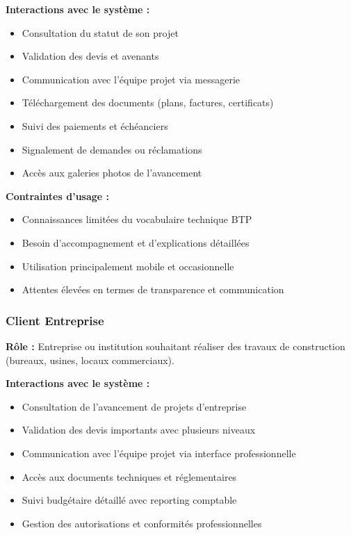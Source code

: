 \textbf{Interactions avec le système :}
\begin{itemize}
    \item Consultation du statut de son projet
    \item Validation des devis et avenants
    \item Communication avec l'équipe projet via messagerie
    \item Téléchargement des documents (plans, factures, certificats)
    \item Suivi des paiements et échéanciers
    \item Signalement de demandes ou réclamations
    \item Accès aux galeries photos de l'avancement
\end{itemize}

\textbf{Contraintes d'usage :}
\begin{itemize}
    \item Connaissances limitées du vocabulaire technique BTP
    \item Besoin d'accompagnement et d'explications détaillées
    \item Utilisation principalement mobile et occasionnelle
    \item Attentes élevées en termes de transparence et communication
\end{itemize}

\subsubsection{Client Entreprise}

\textbf{Rôle :} Entreprise ou institution souhaitant réaliser des travaux de construction (bureaux, usines, locaux commerciaux).

\textbf{Interactions avec le système :}
\begin{itemize}
    \item Consultation de l'avancement de projets d'entreprise
    \item Validation des devis importants avec plusieurs niveaux
    \item Communication avec l'équipe projet via interface professionnelle
    \item Accès aux documents techniques et réglementaires
    \item Suivi budgétaire détaillé avec reporting comptable
    \item Gestion des autorisations et conformités professionnelles
\end{itemize}

